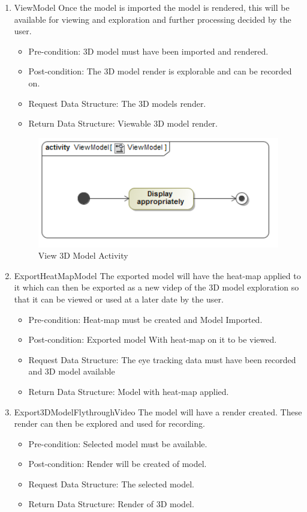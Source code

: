 \begin{enumerate}
		\item{ViewModel}
		Once the model is imported the model is rendered, this will be available for viewing and exploration and further processing decided by the user.
		\begin{itemize}
			\item Pre-condition: 3D model must have been imported and rendered.
			\item Post-condition: The 3D model render is explorable and can be recorded on.
			\item Request Data Structure: The 3D models render.
			\item Return Data Structure: Viewable 3D model render.
		\end{itemize}
		\begin{figure}[!ht]
			\centering
			\includegraphics[scale=0.5,width=15cm,keepaspectratio]{Diagrams/Activity_Diagram__ViewModel__ViewModel.png}
		\caption{View 3D Model Activity}
		\end{figure}
		
		\item{ExportHeatMapModel}
		The exported model will have the heat-map applied to it which can then be exported as a new videp of the 3D model exploration so that it can be viewed or used at a later date by the user. 
		\begin{itemize}
			\item Pre-condition: Heat-map must be created and Model Imported.
			\item Post-condition: Exported model With heat-map on it to be viewed.
			\item Request Data Structure: The eye tracking data must have been recorded and 3D model available
			\item Return Data Structure: Model with heat-map applied.
		\end{itemize}
		
		\item{Export3DModelFlythroughVideo}
		The model will have a render created. These render can then be explored and used for recording.
		\begin{itemize}
			\item Pre-condition: Selected model must be available.
			\item Post-condition: Render will be created of model.
			\item Request Data Structure: The selected model.
			\item Return Data Structure: Render of 3D model.
		\end{itemize}
		

\end{enumerate}
